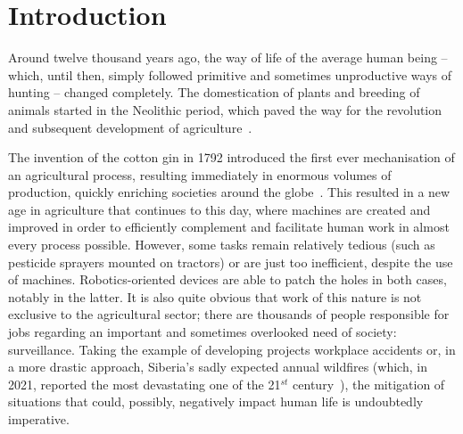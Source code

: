 




\chapter{Introduction}\label{cha:I_introduction}

Around twelve thousand years ago, the way of life of the average human being -- which, until then, simply followed primitive and sometimes unproductive ways of hunting -- changed completely. The domestication of plants and breeding of animals started in the Neolithic period, which paved the way for the revolution and subsequent development of agriculture~\cite{Zeder2011TheOO}.

The invention of the cotton gin in 1792 introduced the first ever mechanisation of an agricultural process, resulting immediately in enormous volumes of production, quickly enriching societies around the globe~\cite{Roe1926}.
This resulted in a new age in agriculture that continues to this day, where machines are created and improved in order to efficiently complement and facilitate human work in almost every process possible.
However, some tasks remain relatively tedious (such as pesticide sprayers mounted on tractors) or are just too inefficient, despite the use of machines. Robotics-oriented devices are able to patch the holes in both cases, notably in the latter.
It is also quite obvious that work of this nature is not exclusive to the agricultural sector; there are thousands of people responsible for jobs regarding an important and sometimes overlooked need of society: surveillance.
Taking the example of developing projects %
workplace accidents or, in a more drastic approach, Siberia's sadly expected annual wildfires (which, in 2021, reported the most devastating one of the 21$^{st}$ century~\cite{dixon_2021,roth_2021}), the mitigation of situations that could, possibly, negatively impact human life is undoubtedly imperative.%

